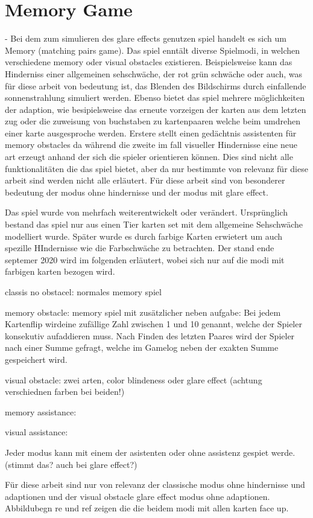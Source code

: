 \chapter{Memory Game}
- Bei dem zum simulieren des glare effects genutzen spiel handelt es sich um Memory (matching pairs game).  Das spiel enntält diverse Spielmodi, in welchen verschiedene memory oder visual obstacles existieren. Beispielsweise kann das Hinderniss einer allgemeinen sehschwäche, der rot grün schwäche oder auch, was für diese arbeit von bedeutung ist, das Blenden des Bildschirms durch einfallende sonnenstrahlung simuliert werden. Ebenso bietet das spiel mehrere möglichkeiten der adaption, wie besipielsweise das erneute vorzeigen der karten aus dem letzten zug oder die zuweisung von buchstaben zu kartenpaaren welche beim umdrehen einer karte ausgesproche werden. Erstere stellt einen gedächtnis assistenten für memory obstacles da während die zweite im fall visueller Hindernisse eine neue art erzeugt anhand der sich die spieler orientieren können. Dies sind nicht alle funktionalitäten die das spiel bietet, aber da nur bestimmte von relevanz für diese arbeit sind werden nicht alle erläutert. Für diese arbeit sind von besonderer bedeutung der modus ohne hindernisse und der modus mit glare effect. 



Das spiel wurde von mehrfach weiterentwickelt oder verändert. Ursprünglich bestand das spiel nur aus einen Tier karten set mit dem allgemeine Sehschwäche modelliert wurde. Später wurde es durch farbige Karten erwietert um auch spezille HIndernisse wie die Farbschwäche zu betrachten. Der stand ende septemer 2020 wird im folgenden erläutert, wobei sich nur auf die modi mit farbigen karten bezogen wird.

classis no obstacel: normales memory spiel

memory obstacle: memory spiel mit zusätzlicher neben aufgabe:  Bei jedem Kartenflip wirdeine zufällige Zahl zwischen 1 und 10 genannt, welche der Spieler konsekutiv aufaddieren muss. Nach Finden des letzten Paares wird der Spieler nach einer Summe gefragt, welche im Gamelog neben der exakten Summe gespeichert wird.

visual obstacle: zwei arten, color blindeness  oder glare effect (achtung verschiednen farben bei beiden!)

memory assistance: 

visual assistance: 

Jeder modus kann mit einem der asistenten oder ohne assistenz gespiet werde. (stimmt das? auch bei glare effect?)

Für diese arbeit sind nur von relevanz der classische modus ohne hindernisse und adaptionen und der visual obstacle glare effect modus ohne adaptionen. Abbildubegn re und ref zeigen die die beidem modi mit allen karten face up. 